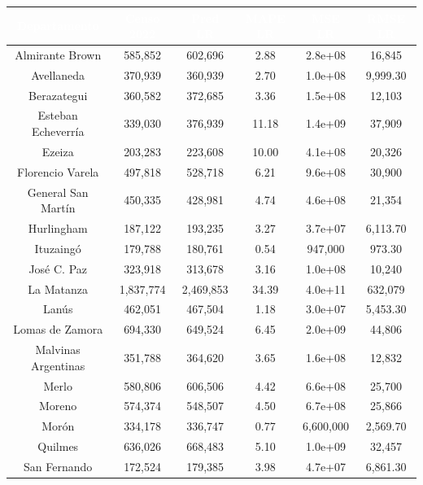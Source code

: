 \documentclass{article}
\theoremstyle{mytheoremstyle}
\theoremstyle{mytheoremstyle}
\theoremstyle{myproblemstyle}
\begin{document}
\begin{table}[htb!]
  \centering
  \begin{tabular}{|c|c|c|c|c|c|}

  \hline
  \textbf{\cellcolor[rgb]{0,0.231,0.427}\textcolor{white}{Departamento}} & \textbf{\cellcolor[rgb]{0,0.231,0.427}\textcolor{white}{Censo 2022}} & \textbf{\cellcolor[rgb]{0,0.231,0.427}\textcolor{white}{Pred LR}} & \textbf{\cellcolor[rgb]{0,0.231,0.427}\textcolor{white}{MAPE LR}} & \textbf{\cellcolor[rgb]{0,0.231,0.427}\textcolor{white}{MSE LR}} & \textbf{\cellcolor[rgb]{0,0.231,0.427}\textcolor{white}{RMSE LR}} \\ \hline
  Almirante Brown & 585,852 & 602,696 & 2.88 & 2.8e+08 & 16,845 \\
  Avellaneda & 370,939 & 360,939 & 2.70 & 1.0e+08 & 9,999.30 \\
  Berazategui & 360,582 & 372,685 & 3.36 & 1.5e+08 & 12,103 \\
  Esteban Echeverría & 339,030 & 376,939 & 11.18 & 1.4e+09 & 37,909 \\
  Ezeiza & 203,283 & 223,608 & 10.00 & 4.1e+08 & 20,326 \\
  Florencio Varela & 497,818 & 528,718 & 6.21 & 9.6e+08 & 30,900 \\
  General San Martín & 450,335 & 428,981 & 4.74 & 4.6e+08 & 21,354 \\
  Hurlingham & 187,122 & 193,235 & 3.27 & 3.7e+07 & 6,113.70 \\
  Ituzaingó & 179,788 & 180,761 & 0.54 & 947,000 & 973.30 \\
  José C. Paz & 323,918 & 313,678 & 3.16 & 1.0e+08 & 10,240 \\
  La Matanza & 1,837,774 & 2,469,853 & 34.39 & 4.0e+11 & 632,079 \\
  Lanús & 462,051 & 467,504 & 1.18 & 3.0e+07 & 5,453.30 \\
  Lomas de Zamora & 694,330 & 649,524 & 6.45 & 2.0e+09 & 44,806 \\
  Malvinas Argentinas & 351,788 & 364,620 & 3.65 & 1.6e+08 & 12,832 \\
  Merlo & 580,806 & 606,506 & 4.42 & 6.6e+08 & 25,700 \\
  Moreno & 574,374 & 548,507 & 4.50 & 6.7e+08 & 25,866 \\
  Morón & 334,178 & 336,747 & 0.77 & 6,600,000 & 2,569.70 \\
  Quilmes & 636,026 & 668,483 & 5.10 & 1.0e+09 & 32,457 \\
  San Fernando & 172,524 & 179,385 & 3.98 & 4.7e+07 & 6,861.30 \\

\end{tabular}
\end{table}
\end{document}
